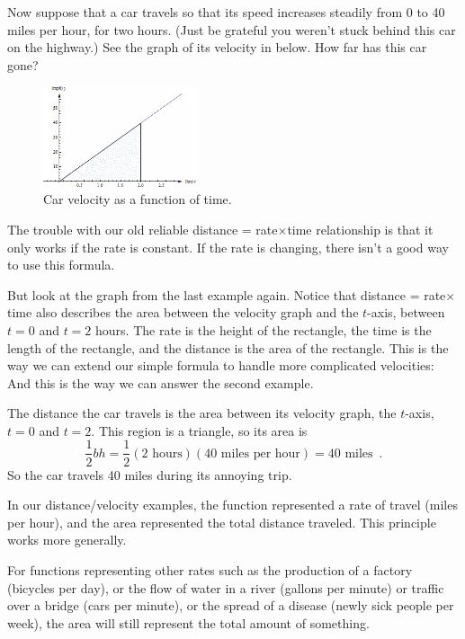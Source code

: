 \begin{example}
Now suppose that a car travels so that its speed increases steadily from 0 to 40 miles per hour, for two hours. (Just be grateful you weren’t stuck behind this car on the highway.) See the graph of its velocity in below. How far has this car gone?

\begin{figure}[!ht]
  \centering
    \includegraphics[width=0.4\textwidth]{img/chap5/image002.png}
    \caption{Car velocity as a function of time.}
    \label{fig:5-2-distance2}
\end{figure}

\begin{solution}
The trouble with our old reliable distance = rate$\times$time relationship is that it only works if the rate is constant. If the rate is changing, there isn’t a good way to use this formula.

But look at the graph from the last example again. Notice that distance = rate$\times$time also describes the area between the velocity graph and the $t$-axis, between $t=0$ and $t=2$ hours. The rate is the height of the rectangle, the time is the length of the rectangle, and the distance is the area of the rectangle. This is the way we can extend our simple formula to handle more complicated velocities: And this is the way we can answer the second example.

The distance the car travels is the area between its velocity graph, the $t$-axis, $t=0$ and $t=2$. This region is a triangle, so its area is
$$\frac{1}{2}bh = \frac{1}{2}(2 \text{ hours})(40 \text{ miles per hour}) = 40 \text{ miles}\enspace .$$
So the car travels 40 miles during its annoying trip.
\end{solution}\end{example}

In our distance/velocity examples, the function represented a rate of travel (miles per hour), and the area represented the total distance traveled. This principle works more generally.

For functions representing other rates such as the production of a factory (bicycles per day), or the flow of water in a river (gallons per minute) or traffic over a bridge (cars per minute), or the spread of a disease (newly sick people per week), the area will still represent the total amount of something.

